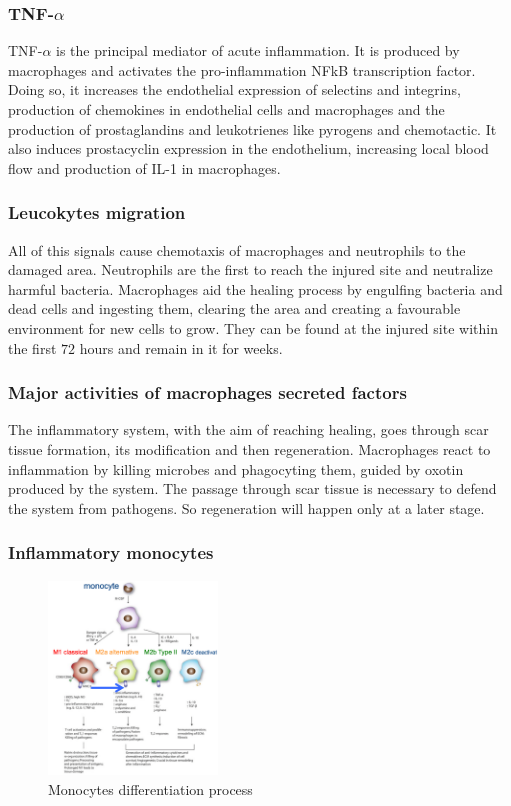 		\subsubsection{TNF-$\alpha$}
		TNF-$\alpha$ is the principal mediator of acute inflammation.
		It is produced by macrophages and activates the pro-inflammation NFkB transcription factor.
		Doing so, it increases the endothelial expression of selectins and integrins, production of chemokines in endothelial cells and macrophages and the production of prostaglandins and leukotrienes like pyrogens and chemotactic.
		It also induces prostacyclin expression in the endothelium, increasing local blood flow and production of IL-1 in macrophages.

		\subsubsection{Leucokytes migration}
		All of this signals cause chemotaxis of macrophages and neutrophils to the damaged area.
		Neutrophils are the first to reach the injured site and neutralize harmful bacteria.
		Macrophages aid the healing process by engulfing bacteria and dead cells and ingesting them, clearing the area and creating a favourable environment for new cells to grow.
		They can be found at the injured site within the first $72$ hours and remain in it for weeks.

		\subsubsection{Major activities of macrophages secreted factors}
		The inflammatory system, with the aim of reaching healing, goes through scar tissue formation, its modification and then regeneration.
		Macrophages react to inflammation by killing microbes and phagocyting them, guided by oxotin produced by the system.
		The passage through scar tissue is necessary to defend the system from pathogens.
		So regeneration will happen only at a later stage.

		\subsubsection{Inflammatory monocytes}

		\begin{figure}[ht]
			\centering
			\includegraphics[width=0.4\textwidth]{mono_diff}
			\caption{Monocytes differentiation process}
			\label{fig:mono}
		\end{figure}

